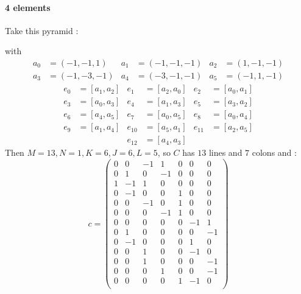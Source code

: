 \paragraph{4 elements}
Take this pyramid :
\begin{figure}[H]
\centering
{}
\end{figure}
with
\begin{align*}
a_0 &= (-1,-1,1) & a_1 &= (-1,-1,-1) & a_2 &= (1,-1,-1)\\
a_3 &= (-1,-3,-1) & a_4 &= (-3,-1,-1) & a_5 &= (-1,1,-1)
\end{align*}
\begin{align*}
e_0 &= [a_1,a_2] & e_1 &= [a_2,a_0] & e_2 &= [a_0,a_1]\\
e_3 &= [a_0,a_3] & e_4 &= [a_1,a_3] & e_5 &= [a_3,a_2]\\
e_6 &= [a_4,a_5] & e_7 &= [a_0,a_5] & e_8 &= [a_0,a_4]\\
e_9 &= [a_1,a_4] & e_{10} &= [a_5,a_1] & e_{11} &= [a_2,a_5]\\
& & e_{12} &= [a_4,a_3] & &
\end{align*}
Then $M=13,N=1,K=6,J=6,L=5$, so $C$ has $13$ lines and $7$ colons and :
\[
c=\begin{pmatrix}
0 & 0 & -1 & 1 & 0 & 0 & 0 \\
 0 & 1 & 0 & -1 & 0 & 0 & 0 \\
 1 & -1 & 1 & 0 & 0 & 0 & 0 \\
 0 & -1 & 0 & 0 & 1 & 0 & 0 \\
 0 & 0 & -1 & 0 & 1 & 0 & 0 \\
 0 & 0 & 0 & -1 & 1 & 0 & 0 \\
 0 & 0 & 0 & 0 & 0 & -1 & 1 \\
 0 & 1 & 0 & 0 & 0 & 0 & -1 \\
 0 & -1 & 0 & 0 & 0 & 1 & 0 \\
 0 & 0 & 1 & 0 & 0 & -1 & 0 \\
 0 & 0 & 1 & 0 & 0 & 0 & -1 \\
 0 & 0 & 0 & 1 & 0 & 0 & -1 \\
 0 & 0 & 0 & 0 & 1 & -1 & 0 \\
\end{pmatrix}\]

